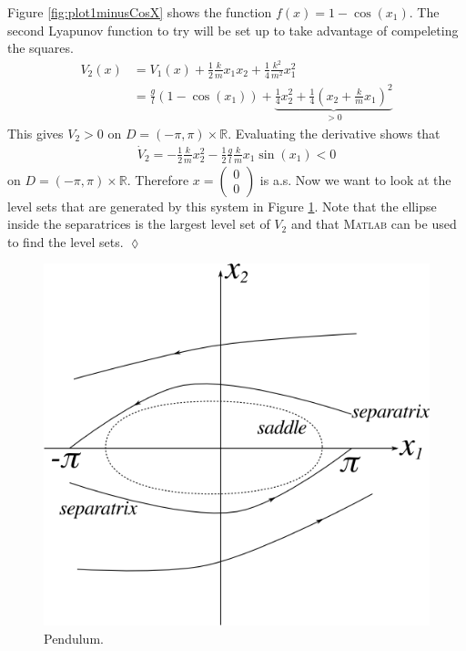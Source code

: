 \begin{example}
Figure \ref{fig:plot1minusCosX} shows the function $f(x) = 1-\cos(x_1)$. The second Lyapunov function to try will be set up to take advantage of compeleting the squares.
\begin{align*}
V_2(x) &= V_1(x) + \tfrac{1}{2}\tfrac{k}{m}x_1x_2 + \tfrac{1}{4}\tfrac{k^2}{m^2}x_1^2 \\
&= \tfrac{g}{l}(1-\cos(x_1)) + \underbrace{\tfrac{1}{4}x_2^2 + \tfrac{1}{4}(x_2+\tfrac{k}{m}x_1)^2}_{>0}
\end{align*}
This gives $V_2>0$ on $D=(-\pi,\pi)\times\mathbb{R}$. Evaluating the derivative shows that
\begin{align*}
\dot{V}_2 = -\tfrac{1}{2}\tfrac{k}{m}x_2^2 - \tfrac{1}{2}\tfrac{g}{l}\tfrac{k}{m}x_1\sin(x_1) < 0
\end{align*}
on $D=(-\pi,\pi)\times\mathbb{R}$. Therefore $x=\left(\begin{array}{c} 0 \\ 0 \end{array}\right)$ is a.s. Now we want to look at the level sets that are generated by this system in Figure \ref{fig:09separatrix}. Note that the ellipse inside the separatrices is the largest level set of $V_2$ and that \textsc{Matlab} can be used to find the level sets.
$\lozenge$
\end{example}

\begin{figure}[ht!]
	\centering
	\includegraphics[width=.5\textwidth]{images/09separatrix}
	\caption{Pendulum.}
	\label{fig:09separatrix}
\end{figure}

